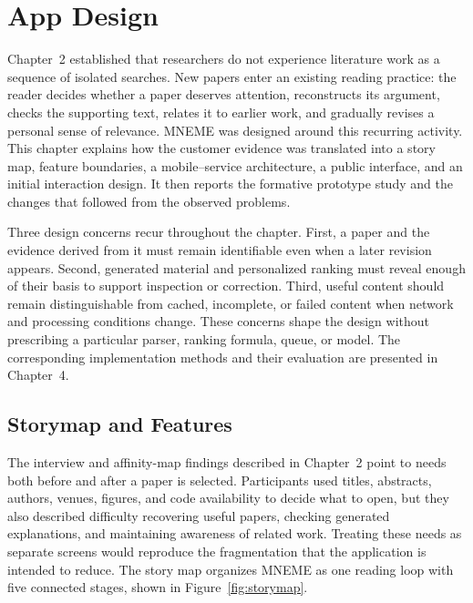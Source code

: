 
\chapter{App Design}
\label{chap:app-design}


Chapter~2 established that researchers do not experience literature work as a sequence of isolated searches. New papers enter an existing reading practice: the reader decides whether a paper deserves attention, reconstructs its argument, checks the supporting text, relates it to earlier work, and gradually revises a personal sense of relevance. MNEME was designed around this recurring activity. This chapter explains how the customer evidence was translated into a story map, feature boundaries, a mobile--service architecture, a public interface, and an initial interaction design. It then reports the formative prototype study and the changes that followed from the observed problems.

Three design concerns recur throughout the chapter. First, a paper and the evidence derived from it must remain identifiable even when a later revision appears. Second, generated material and personalized ranking must reveal enough of their basis to support inspection or correction. Third, useful content should remain distinguishable from cached, incomplete, or failed content when network and processing conditions change. These concerns shape the design without prescribing a particular parser, ranking formula, queue, or model. The corresponding implementation methods and their evaluation are presented in Chapter~4.

\section{Storymap and Features}
\label{sec:storymap-features}

The interview and affinity-map findings described in Chapter~2 point to needs both before and after a paper is selected. Participants used titles, abstracts, authors, venues, figures, and code availability to decide what to open, but they also described difficulty recovering useful papers, checking generated explanations, and maintaining awareness of related work. Treating these needs as separate screens would reproduce the fragmentation that the application is intended to reduce. The story map organizes MNEME as one reading loop with five connected stages, shown in Figure~\ref{fig:storymap}.

